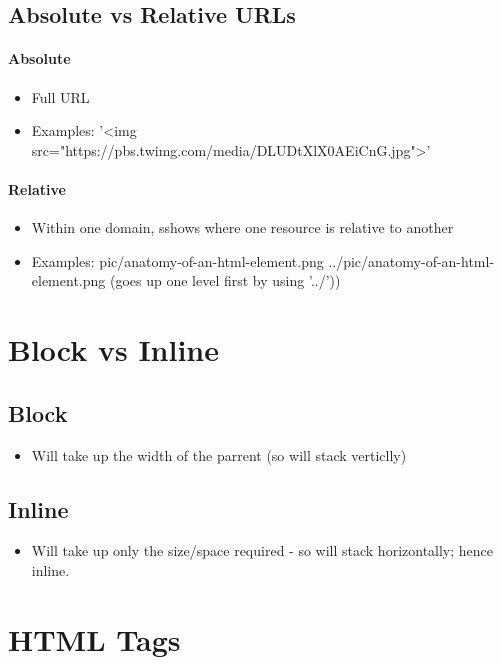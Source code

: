 \documentclass[]{article}
\begin{document}
\subsection{Absolute vs Relative URLs}
\paragraph{Absolute}

	\begin{itemize}
		\item Full URL
		\item Examples:
		\subitem '<img src="https://pbs.twimg.com/media/DLUDtXlX0AEiCnG.jpg">'
	\end{itemize}

\paragraph{Relative}

	\begin{itemize}
		\item Within one domain, sshows where one resource is relative to another
		\item Examples:
		\subitem pic/anatomy-of-an-html-element.png
		\subitem ../pic/anatomy-of-an-html-element.png (goes up one level first by using '../'))
	\end{itemize}

\section{Block vs Inline}
\subsection{Block}
\begin{itemize}
	\item Will take up the width of the parrent (so will stack verticlly)
\end{itemize}
\subsection{Inline} 
\begin{itemize}
	\item Will take up only the size/space required - so will stack horizontally; hence inline.
\end{itemize}

\section{HTML Tags}
\end{document}
